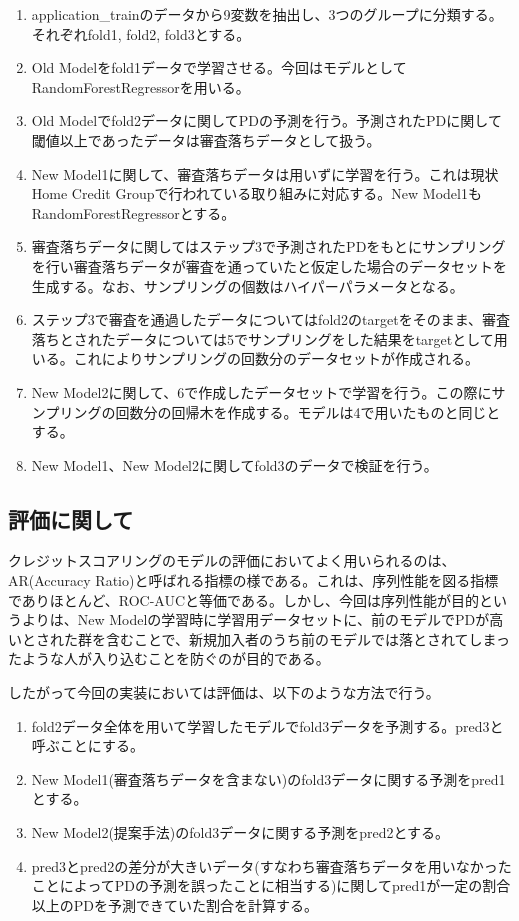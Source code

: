 \documentclass[11pt]{jsarticle}
\providecommand{\tightlist}{%
      \setlength{\itemsep}{0pt}\setlength{\parskip}{0pt}}
\begin{document}
\begin{enumerate}
\def\labelenumi{\arabic{enumi}.}
\tightlist
\item
  application\_trainのデータから9変数を抽出し、3つのグループに分類する。それぞれfold1,
  fold2, fold3とする。
\item
  Old
  Modelをfold1データで学習させる。今回はモデルとしてRandomForestRegressorを用いる。
\item
  Old
  Modelでfold2データに関してPDの予測を行う。予測されたPDに関して閾値以上であったデータは審査落ちデータとして扱う。
\item
  New Model1に関して、審査落ちデータは用いずに学習を行う。これは現状Home
  Credit Groupで行われている取り組みに対応する。New
  Model1もRandomForestRegressorとする。
\item
  審査落ちデータに関してはステップ3で予測されたPDをもとにサンプリングを行い審査落ちデータが審査を通っていたと仮定した場合のデータセットを生成する。なお、サンプリングの個数はハイパーパラメータとなる。
\item
  ステップ3で審査を通過したデータについてはfold2のtargetをそのまま、審査落ちとされたデータについては5でサンプリングをした結果をtargetとして用いる。これによりサンプリングの回数分のデータセットが作成される。
\item
  New
  Model2に関して、6で作成したデータセットで学習を行う。この際にサンプリングの回数分の回帰木を作成する。モデルは4で用いたものと同じとする。
\item
  New Model1、New Model2に関してfold3のデータで検証を行う。
\end{enumerate}

    \subsection{評価に関して}\label{ux8a55ux4fa1ux306bux95a2ux3057ux3066}

    クレジットスコアリングのモデルの評価においてよく用いられるのは、AR(Accuracy
Ratio)と呼ばれる指標の様である\cite{risk-management}。これは、序列性能を図る指標でありほとんど、ROC-AUCと等価である。しかし、今回は序列性能が目的というよりは、New
Modelの学習時に学習用データセットに、前のモデルでPDが高いとされた群を含むことで、新規加入者のうち前のモデルでは落とされてしまったような人が入り込むことを防ぐのが目的である。

したがって今回の実装においては評価は、以下のような方法で行う。

\begin{enumerate}
\def\labelenumi{\arabic{enumi}.}
\tightlist
\item
  fold2データ全体を用いて学習したモデルでfold3データを予測する。pred3と呼ぶことにする。
\item
  New
  Model1(審査落ちデータを含まない)のfold3データに関する予測をpred1とする。
\item
  New Model2(提案手法)のfold3データに関する予測をpred2とする。
\item
  pred3とpred2の差分が大きいデータ(すなわち審査落ちデータを用いなかったことによってPDの予測を誤ったことに相当する)に関してpred1が一定の割合以上のPDを予測できていた割合を計算する。
\end{enumerate}
\end{document}
